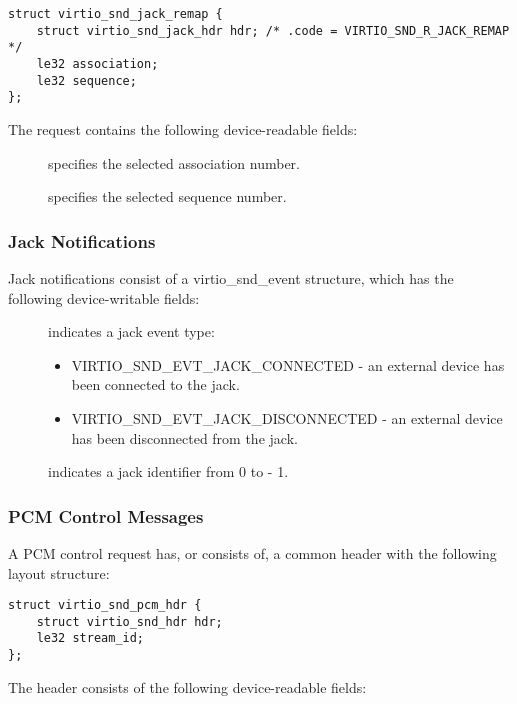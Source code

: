 \begin{lstlisting}
struct virtio_snd_jack_remap {
    struct virtio_snd_jack_hdr hdr; /* .code = VIRTIO_SND_R_JACK_REMAP */
    le32 association;
    le32 sequence;
};
\end{lstlisting}

The request contains the following device-readable fields:

\begin{description}
\item[] specifies the selected association number.
\item[] specifies the selected sequence number.
\end{description}

\subsubsection{Jack Notifications}

Jack notifications consist of a virtio_snd_event structure, which has the following
device-writable fields:

\begin{description}
\item[] indicates a jack event type:
\begin{itemize}
\item VIRTIO_SND_EVT_JACK_CONNECTED - an external device has been connected to the jack.
\item VIRTIO_SND_EVT_JACK_DISCONNECTED - an external device has been disconnected from the jack.
\end{itemize}
\item[] indicates a jack identifier from 0 to  - 1.
\end{description}

\subsubsection{PCM Control Messages}\label{sec:Device Types / Sound Device / Device Operation / PCM Control Messages}

A PCM control request has, or consists of, a common header with the following
layout structure:

\begin{lstlisting}
struct virtio_snd_pcm_hdr {
    struct virtio_snd_hdr hdr;
    le32 stream_id;
};
\end{lstlisting}

The header consists of the following device-readable fields:

